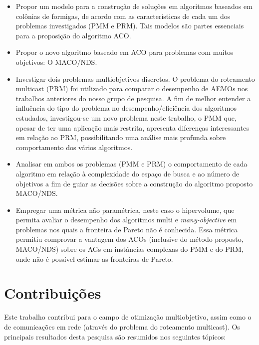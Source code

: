 \begin{itemize}
	\item Propor um modelo para a construção de soluções em algoritmos baseados em colônias de formigas, de acordo com as características de cada um dos problemas investigados (PMM e PRM). Tais modelos são partes essenciais para a proposição do algoritmo ACO.
	\item Propor o novo algoritmo baseado em \ac{ACO} para problemas com muitos objetivos: O \ac{MACO/NDS}. 
	\item Investigar dois problemas multiobjetivos discretos. O problema do roteamento multicast (PRM) foi utilizado para comparar o desempenho de AEMOs nos trabalhos anteriores do nosso grupo de pesquisa. A fim de melhor entender a influência do tipo do problema no desempenho/eficiência dos algoritmos estudados, investigou-se um novo problema neste trabalho, o \ac{PMM} que, apesar de ter uma aplicação mais restrita, apresenta diferenças interessantes em relação ao \ac{PRM}, possibilitando uma análise mais profunda sobre comportamento dos vários algoritmos.
	\item Analisar em ambos os problemas (\ac{PMM} e \ac{PRM}) o comportamento de cada algoritmo em relação à complexidade do espaço de busca e ao número de objetivos a fim de guiar as decisões sobre a construção do algoritmo proposto MACO/NDS.
	\item Empregar uma métrica não paramétrica, neste caso o hipervolume, que permita avaliar o desempenho dos algoritmos multi e \textit{many-objective} em problemas nos quais a fronteira de Pareto não é conhecida. Essa métrica permitiu comprovar a vantagem dos ACOs (inclusive do método proposto, MACO/NDS) sobre os AGs em instâncias complexas do PMM e do PRM, onde não é possível estimar as fronteiras de Pareto.
\end{itemize}


\section{Contribuições}
Este trabalho contribui para o campo de otimização multiobjetivo, assim como o de comunicações em rede (através do problema do roteamento multicast). Os principais resultados desta pesquisa são resumidos nos seguintes tópicos:

